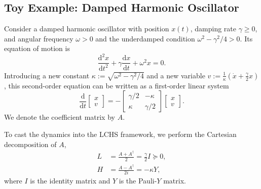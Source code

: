 \documentclass{article}
\newcommand{\dd}{\mathrm{d}}
\begin{document}



\subsection{Toy Example: Damped Harmonic Oscillator}


Consider a damped harmonic oscillator with position $x(t)$, damping rate $\gamma \ge 0$, and angular frequency $\omega > 0$ and the underdamped condition $\omega^2 - \gamma^2/4 > 0$. Its equation of motion is
\begin{equation}
\frac{\dd^2 x}{\dd t^2} + \gamma \frac{\dd x}{\dd t} + \omega^2 x = 0 .
\end{equation}
Introducing a new constant $\kappa:=\sqrt{\omega^2 - \gamma^2/4}$ and a new variable $v:= \frac{1}{\kappa} (\dot{x}+\frac{\gamma}{2}x)$, this second-order equation can be written as a first-order linear system
\begin{equation}
\frac{\dd}{\dd t}
\begin{bmatrix}
x \\ v
\end{bmatrix}
=
-
\begin{bmatrix}
\gamma/2 & -\kappa \\
\kappa & \gamma/2
\end{bmatrix}
\begin{bmatrix}
x \\ v
\end{bmatrix}.
\label{eq:DHO}
\end{equation}
We denote the coefficient matrix by $A$.

To cast the dynamics into the LCHS framework, we perform the Cartesian decomposition of $A$,
\begin{align}
L &= \frac{A + A^\dagger}{2}
   = \frac{\gamma}{2} I \succeq 0, \\
H &= \frac{A - A^\dagger}{2i}
   = - \kappa Y ,
\end{align}
where $I$ is the identity matrix and $Y$ is the Pauli-$Y$ matrix.
\end{document}
